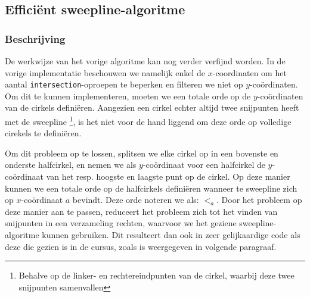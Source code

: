\documentclass[12pt]{article}
\begin{document}
\subsection{Efficiënt sweepline-algoritme}
\subsubsection{Beschrijving}
De werkwijze van het vorige algoritme kan nog verder verfijnd worden. In de vorige implementatie beschouwen we namelijk enkel de $ x $-coordinaten om het aantal \texttt{intersection}-oproepen te beperken en filteren we niet op $ y $-coördinaten. Om dit te kunnen implementeren, moeten we een totale orde op de $ y $-coördinaten van de cirkels definiëren. Aangezien een cirkel echter altijd twee snijpunten heeft met de sweepline \footnote{Behalve op de linker- en rechtereindpunten van de cirkel, waarbij deze twee snijpunten samenvallen}, is het niet voor de hand liggend om deze orde op volledige cirekels te definiëren. 

Om dit probleem op te lossen, splitsen we elke cirkel op in een bovenste en onderste halfcirkel, en nemen we als $ y $-coördinaat voor een halfcirkel de $ y$-coördinaat van het resp. hoogste en laagste punt op de cirkel. Op deze manier kunnen we een totale orde op de halfcirkels definiëren wanneer te sweepline zich op $x$-coördinaat $ a $ bevindt. Deze orde noteren we als: $ <_a $. Door het probleem op deze manier aan te passen, reduceert het probleem zich tot het vinden van snijpunten in een verzameling rechten, waarvoor we het geziene sweepline-algoritme kunnen gebruiken. Dit resulteert dan ook in zeer gelijkaardige code als deze die gezien is in de cursus, zoals is weergegeven in volgende paragraaf. 
\end{document}
